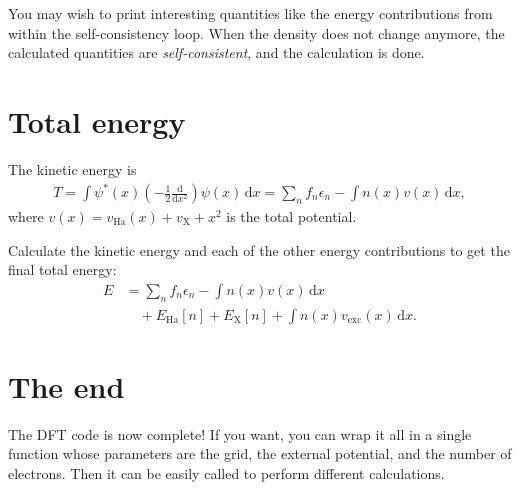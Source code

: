 \documentclass{article}
\newcommand{\exercise}[1]{
  \bigskip
  \begin{boxedminipage}[c]{0.8\linewidth}
  #1
  \end{boxedminipage}
  \bigskip
}
\newcommand{\dee}[0]{\mathrm d}
\newcommand{\idee}[0]{\,\dee}
\newcommand{\diff}[2]{\frac{\dee #1}{\dee #2}}
\newcommand{\Ha}[0]{\mathrm{Ha}}
\newcommand{\X}[0]{\mathrm{X}}
\begin{document}
\noindent You may wish to print interesting quantities like the energy
contributions from within the self-consistency loop.
When the
density does not change anymore, the calculated quantities are
\emph{self-consistent}, and the calculation is done.

\section{Total energy}
The kinetic energy is
\begin{align}
  T = \int \psi^*(x)\left(-\frac12 \diff{}{x^2}\right) \psi(x) \idee x
  = \sum_n f_n \epsilon_n - \int n(x) v(x) \idee x,
\end{align}
where $v(x) = v_\Ha(x) + v_\X + x^2$ is the total potential.

\exercise{
Calculate the kinetic energy and each of the other energy contributions to get the final total energy:
\begin{align}
  E &= \sum_n f_n \epsilon_n - \int n(x) v(x) \idee x \nonumber\\
  &\quad+ E_\Ha[n] + E_\X[n] + \int n(x) v_{\mathrm{exc}}(x) \idee x.
\end{align}
}

\section{The end}

The DFT code is now complete!  If you want, you can wrap it all in a
single function whose parameters are the grid, the external potential,
and the number of electrons.  Then it can be easily called to perform
different calculations.
\end{document}
